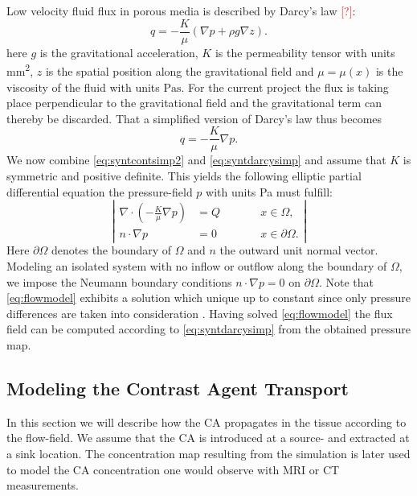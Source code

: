 \documentclass[paper=a4, fontsize=11pt,parskip=half,headings=small]{scrartcl}
\newcommand{\missingsource}{\textcolor{red}{[?]}}
\begin{document}
	Low velocity fluid flux in porous media is described by Darcy's law \missingsource:
	\[
		q = -\frac{K}{\mu} \left( \nabla p + \rho g  \nabla z \right).
	\]
	here $g$ is the gravitational acceleration, $K$ is the permeability tensor with units \si{\square\milli\meter}, $z$ is the spatial position along the gravitational field and $\mu = \mu(x)$ is the viscosity of the fluid with units $\si{\pascal\second}$.
	For the current project the flux is taking place perpendicular to the gravitational field and the gravitational term can thereby be discarded.
	That a simplified version of Darcy's law thus becomes
	\begin{equation}
		q = -\frac{K}{\mu} \nabla p.
		\label{eq:syntdarcysimp}
	\end{equation}
	We now combine \eqref{eq:syntcontsimp2} and \eqref{eq:syntdarcysimp} and assume that $K$ is symmetric and positive definite.
	This yields the following elliptic partial differential equation the pressure-field $p$ with units \si{\pascal} must fulfill:
	\begin{equation}
		\left\vert
		\begin{alignedat}{2}
			\nabla \cdot \left( -\frac{K}{\mu} \nabla p \right) &= Q  \qquad &&x \in \Omega, \\
			n \cdot \nabla p &=0 &&x \in \partial \Omega.
		\end{alignedat}
		\right\vert
		\label{eq:flowmodel}
	\end{equation}
	Here $\partial \Omega$ denotes the boundary of $\Omega$ and $n$ the outward unit normal vector. 
	Modeling an isolated system with no inflow or outflow along the boundary of $\Omega$, we impose the Neumann boundary conditions $n \cdot \nabla p = 0$ on $\partial \Omega$.
	Note that \eqref{eq:flowmodel} exhibits a solution which unique up to constant since only pressure differences are taken into consideration \cite{evans98}.
	Having solved \eqref{eq:flowmodel} the flux field can be computed according to \eqref{eq:syntdarcysimp} from the obtained pressure map. 
	
	
	\subsection{Modeling the Contrast Agent Transport}\label{sec:transport}
	In this section we will describe how the CA propagates in the tissue according to the flow-field.
	We assume that the CA is introduced at a source- and extracted at a sink location.
	The concentration map resulting from the simulation is later used to model the CA concentration one would observe with MRI or CT measurements.
	
\end{document}
